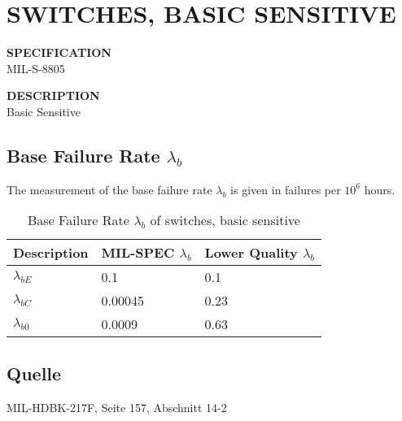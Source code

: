 \section{SWITCHES, BASIC SENSITIVE}

\begin{minipage}[t]{0.29\textwidth}
    \textbf{SPECIFICATION}\\
    MIL-S-8805
\end{minipage}
\begin{minipage}[t]{0.7\textwidth}
    \textbf{DESCRIPTION}\\
    Basic Sensitive
\end{minipage}

\subsection{Base Failure Rate $\lambda_b$}
The measurement of the base failure rate $\lambda_b$ is given in failures per $10^6$ hours.
\begin{table}[ht]
{\centering

\begin{tabular}{|p{3cm}|p{3cm}|p{3cm}|}
    \hline
    \textbf{Description} & \textbf{MIL-SPEC $\lambda_b$} & \textbf{Lower Quality $\lambda_b$}\\
    \hline
    $\lambda_{bE}$ & 0.1 & 0.1 \\
    \hline
    $\lambda_{bC}$ & 0.00045 & 0.23 \\
    \hline
    $\lambda_{b0}$ & 0.0009 & 0.63 \\
    \hline
\end{tabular}

\caption{Base Failure Rate $\lambda_b$ of switches, basic sensitive}

\label{tab:bfr_switches_basic_sensitive}
\par}
\end{table}
\subsection*{Quelle}
MIL-HDBK-217F, Seite 157, Abschnitt 14-2